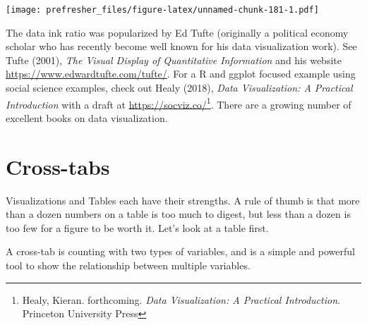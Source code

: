 \documentclass[]{book}
\newenvironment{Shaded}{\begin{snugshade}}{\end{snugshade}}
\newcommand{\KeywordTok}[1]{\textcolor[rgb]{0.13,0.29,0.53}{\textbf{#1}}}
\newcommand{\StringTok}[1]{\textcolor[rgb]{0.31,0.60,0.02}{#1}}
\newcommand{\OperatorTok}[1]{\textcolor[rgb]{0.81,0.36,0.00}{\textbf{#1}}}
\newcommand{\NormalTok}[1]{#1}
\let\rmarkdownfootnote\footnote%
\def\footnote{\protect\rmarkdownfootnote}
\theoremstyle{definition}
\theoremstyle{definition}
\theoremstyle{definition}
\theoremstyle{remark}
\begin{document}
\texttt{[image: prefresher\_files/figure-latex/unnamed-chunk-181-1.pdf]}

The data ink ratio was popularized by Ed Tufte (originally a political
economy scholar who has recently become well known for his data
visualization work). See Tufte (2001), \emph{The Visual Display of
Quantitative Information} and his website
\url{https://www.edwardtufte.com/tufte/}. For a R and ggplot focused
example using social science examples, check out Healy (2018),
\emph{Data Visualization: A Practical Introduction} with a draft at
\url{https://socviz.co/}\footnote{Healy, Kieran. forthcoming. \emph{Data
  Visualization: A Practical Introduction}. Princeton University Press}.
There are a growing number of excellent books on data visualization.

\section{Cross-tabs}\label{cross-tabs}

Visualizations and Tables each have their strengths. A rule of thumb is
that more than a dozen numbers on a table is too much to digest, but
less than a dozen is too few for a figure to be worth it. Let's look at
a table first.

A cross-tab is counting with two types of variables, and is a simple and
powerful tool to show the relationship between multiple variables.

\begin{Shaded}
\end{Shaded}
\end{document}
